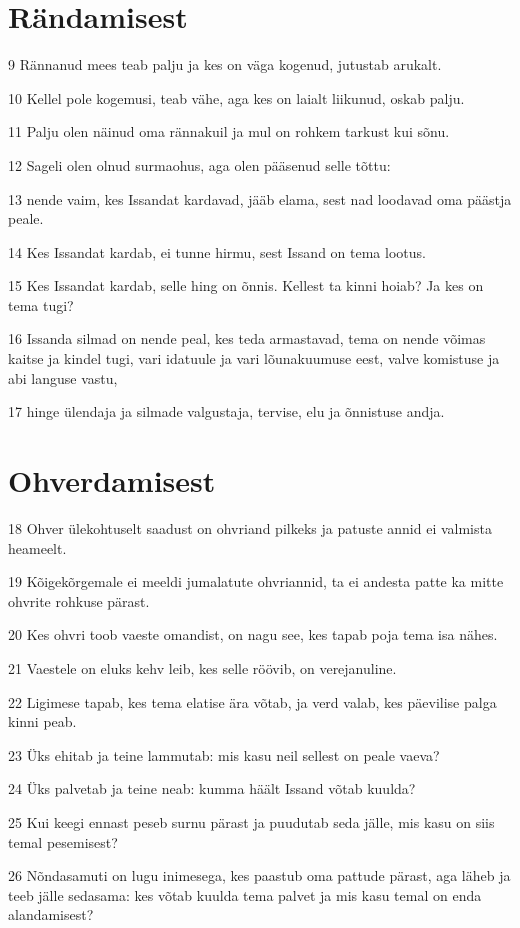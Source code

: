 \section*{Rändamisest}

\par 9 Rännanud mees teab palju ja kes on väga kogenud, jutustab arukalt.
\par 10 Kellel pole kogemusi, teab vähe, aga kes on laialt liikunud, oskab palju.
\par 11 Palju olen näinud oma rännakuil ja mul on rohkem tarkust kui sõnu.
\par 12 Sageli olen olnud surmaohus, aga olen pääsenud selle tõttu:
\par 13 nende vaim, kes Issandat kardavad, jääb elama, sest nad loodavad oma päästja peale.
\par 14 Kes Issandat kardab, ei tunne hirmu, sest Issand on tema lootus.
\par 15 Kes Issandat kardab, selle hing on õnnis. Kellest ta kinni hoiab? Ja kes on tema tugi?
\par 16 Issanda silmad on nende peal, kes teda armastavad, tema on nende võimas kaitse ja kindel tugi, vari idatuule ja vari lõunakuumuse eest, valve komistuse ja abi languse vastu,
\par 17 hinge ülendaja ja silmade valgustaja, tervise, elu ja õnnistuse andja.

\section*{Ohverdamisest}

\par 18 Ohver ülekohtuselt saadust on ohvriand pilkeks ja patuste annid ei valmista heameelt.
\par 19 Kõigekõrgemale ei meeldi jumalatute ohvriannid, ta ei andesta patte ka mitte ohvrite rohkuse pärast.
\par 20 Kes ohvri toob vaeste omandist, on nagu see, kes tapab poja tema isa nähes.
\par 21 Vaestele on eluks kehv leib, kes selle röövib, on verejanuline.
\par 22 Ligimese tapab, kes tema elatise ära võtab, ja verd valab, kes päevilise palga kinni peab.
\par 23 Üks ehitab ja teine lammutab: mis kasu neil sellest on peale vaeva?
\par 24 Üks palvetab ja teine neab: kumma häält Issand võtab kuulda?
\par 25 Kui keegi ennast peseb surnu pärast ja puudutab seda jälle, mis kasu on siis temal pesemisest?
\par 26 Nõndasamuti on lugu inimesega, kes paastub oma pattude pärast, aga läheb ja teeb jälle sedasama: kes võtab kuulda tema palvet ja mis kasu temal on enda alandamisest?

